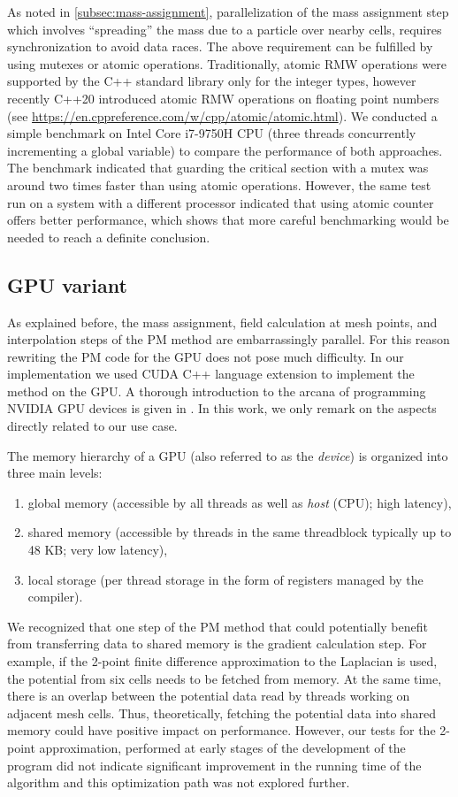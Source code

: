 As noted in \autoref{subsec:mass-assignment}, parallelization of the mass assignment step which involves ``spreading'' the mass due to a particle over nearby cells, requires synchronization to avoid data races.
The above requirement can be fulfilled by using mutexes or atomic operations.
Traditionally, atomic RMW operations were supported by the C++ standard library only for the integer types, however recently C++20 introduced atomic RMW operations on floating point numbers (see \url{https://en.cppreference.com/w/cpp/atomic/atomic.html}).
We conducted a simple benchmark on Intel Core i7-9750H CPU (three threads concurrently incrementing a global variable) to compare the performance of both approaches.
The benchmark indicated that guarding the critical section with a mutex was around two times faster than using atomic operations.
However, the same test run on a system with a different processor indicated that using atomic counter offers better performance, which shows that more careful benchmarking would be needed to reach a definite conclusion.

\subsection{GPU variant}
As explained before, the mass assignment, field calculation at mesh points, and interpolation steps of the PM method are embarrassingly parallel.
For this reason rewriting the PM code for the GPU does not pose much difficulty.
In our implementation we used CUDA C++ language extension to implement the method on the GPU.
A thorough introduction to the arcana of programming NVIDIA GPU devices is given in \cite{nvidia2025cuda}.
In this work, we only remark on the aspects directly related to our use case.

The memory hierarchy of a GPU (also referred to as the \textit{device}) is organized into three main levels:
\begin{enumerate}
    \item global memory (accessible by all threads as well as \textit{host} (CPU); high latency),
    \item shared memory (accessible by threads in the same threadblock typically up to 48 KB; very low latency),
    \item local storage (per thread storage in the form of registers managed by the compiler).
\end{enumerate}
We recognized that one step of the PM method that could potentially benefit from transferring data to shared memory is the gradient calculation step.
For example, if the 2-point finite difference approximation to the Laplacian is used, the potential from six cells needs to be fetched from memory.
At the same time, there is an overlap between the potential data read by threads working on adjacent mesh cells.
Thus, theoretically, fetching the potential data into shared memory could have positive impact on performance.
However, our tests for the 2-point approximation, performed at early stages of the development of the program did not indicate significant improvement in the running time of the algorithm and this optimization path was not explored further.

